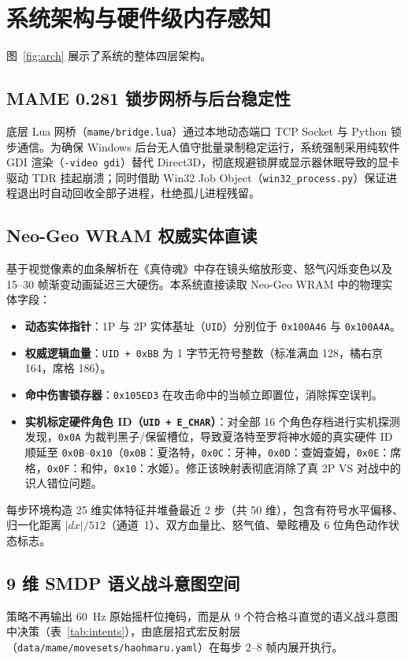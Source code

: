 \documentclass[10pt,twocolumn]{article}
\begin{document}
\section{系统架构与硬件级内存感知}
图~\ref{fig:arch} 展示了系统的整体四层架构。

\subsection{MAME 0.281 锁步网桥与后台稳定性}
底层 Lua 网桥（\texttt{mame/bridge.lua}）通过本地动态端口 TCP Socket 与 Python 锁步通信。为确保 Windows 后台无人值守批量录制稳定运行，系统强制采用纯软件 GDI 渲染（\texttt{-video gdi}）替代 Direct3D，彻底规避锁屏或显示器休眠导致的显卡驱动 TDR 挂起崩溃；同时借助 Win32 Job Object（\texttt{win32\_process.py}）保证进程退出时自动回收全部子进程，杜绝孤儿进程残留。

\subsection{Neo-Geo WRAM 权威实体直读}
基于视觉像素的血条解析在《真侍魂》中存在镜头缩放形变、怒气闪烁变色以及 15--30 帧渐变动画延迟三大硬伤。本系统直接读取 Neo-Geo WRAM 中的物理实体字段：
\begin{itemize}
    \item \textbf{动态实体指针}：1P 与 2P 实体基址（\texttt{UID}）分别位于 \texttt{0x100A46} 与 \texttt{0x100A4A}。
    \item \textbf{权威逻辑血量}：\texttt{UID + 0xBB} 为 1 字节无符号整数（标准满血 128，橘右京 164，席格 186）。
    \item \textbf{命中伤害锁存器}：\texttt{0x105ED3} 在攻击命中的当帧立即置位，消除挥空误判。
    \item \textbf{实机标定硬件角色 ID（\texttt{UID + E\_CHAR}）}：对全部 16 个角色存档进行实机探测发现，\texttt{0x0A} 为裁判黑子/保留槽位，导致夏洛特至罗将神水姬的真实硬件 ID 顺延至 \texttt{0x0B}--\texttt{0x10}（\texttt{0x0B}：夏洛特，\texttt{0x0C}：牙神，\texttt{0x0D}：查姆查姆，\texttt{0x0E}：席格，\texttt{0x0F}：和仲，\texttt{0x10}：水姬）。修正该映射表彻底消除了真 2P VS 对战中的识人错位问题。
\end{itemize}

每步环境构造 25 维实体特征并堆叠最近 2 步（共 50 维），包含有符号水平偏移、归一化距离 $|dx|/512$（通道~1）、双方血量比、怒气值、晕眩槽及 6 位角色动作状态标志。

\subsection{9 维 SMDP 语义战斗意图空间}
策略不再输出 60~Hz 原始摇杆位掩码，而是从 9 个符合格斗直觉的语义战斗意图中决策（表~\ref{tab:intents}），由底层招式宏反射层（\texttt{data/mame/movesets/haohmaru.yaml}）在每步 2--8 帧内展开执行。
\end{document}
